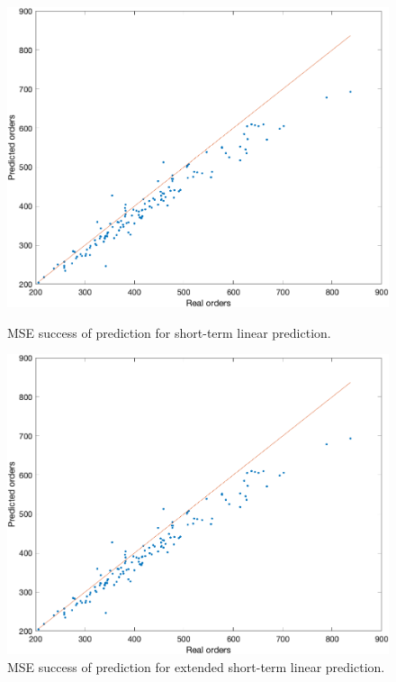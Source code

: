         \begin{figure}[!ht]
            \begin{minipage}{0.45\textwidth}
                \centering
                \includegraphics[width=1\textwidth]{figures/expCompLP.png}
                \caption{MSE success of prediction for short-term linear prediction.}
                \label{fig:eltlpres}
            \end{minipage}\hfill
            \begin{minipage}{0.45\textwidth}
                \centering
                \includegraphics[width=1\textwidth]{figures/expCompELP.png}
                \caption{MSE success of prediction for extended short-term linear prediction.}
                \label{fig:eltlpmse}
            \end{minipage}
        \end{figure}

